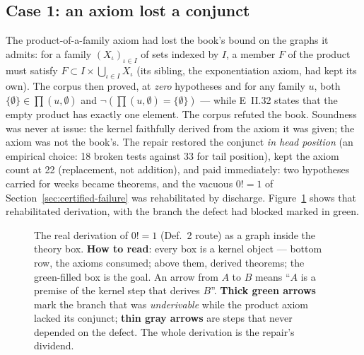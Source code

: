 \documentclass[11pt]{article}
\theoremstyle{remark}\newtheorem{example}{Example}
\begin{document}
\subsection{Case 1: an axiom lost a conjunct}
The product-of-a-family axiom had lost the book's bound on the graphs it admits: for a
family $(X_\iota)_{\iota \in I}$ of sets indexed by $I$, a member $F$ of the product
must satisfy $F \subset I \times \bigcup_{\iota \in I} X_\iota$ (its sibling, the
exponentiation axiom, had kept its own). The corpus then proved, at \emph{zero}
hypotheses and for any family $u$, both
$\{\emptyset\} \in \prod(u,\emptyset)$ and
$\neg(\prod(u,\emptyset) = \{\emptyset\})$ --- while E~II.32 states that the empty
product has exactly one element. The corpus refuted the book. Soundness was never at
issue: the kernel faithfully derived from the axiom it was given; the axiom was not
the book's. The repair restored the conjunct \emph{in head position} (an empirical
choice: 18 broken tests against 33 for tail position), kept the axiom count at 22
(replacement, not addition), and paid immediately: two hypotheses carried for weeks
became theorems, and the vacuous $0! = 1$ of
Section~\ref{sec:certified-failure} was rehabilitated by discharge.
Figure~\ref{fig:proofgraph} shows that rehabilitated derivation, with
the branch the defect had blocked marked in green.

\begin{figure}[t]\centering
{}
\caption{The real derivation of $0! = 1$ (Def.~2 route) as a graph inside the theory
box. \textbf{How to read}: every box is a kernel object --- bottom row, the axioms
consumed; above them, derived theorems; the green-filled box is the goal. An arrow
from $A$ to $B$ means ``$A$ is a premise of the kernel step that derives $B$''.
\textbf{Thick green arrows} mark the branch that was \emph{underivable} while the
product axiom lacked its conjunct; \textbf{thin gray arrows} are steps that never
depended on the defect. The whole derivation is the repair's dividend.}
\label{fig:proofgraph}
\end{figure}
\end{document}
